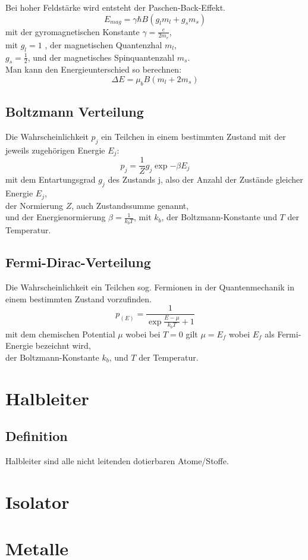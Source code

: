       Bei hoher Feldstärke wird entsteht der Paschen-Back-Effekt.
      \begin{equation}
        E_{mag}= \gamma  \hbar  B \left( g_l m_l + g_s m_s \right)
      \end{equation}
      mit der gyromagnetischen Konstante $\gamma = \frac{e}{2m_e}$, \\
      mit $g_l=1$ , der magnetischen Quantenzhal $m_l$, \\
      $g_s=\frac{1}{2}$, und der magnetisches Spinquantenzahl $m_s$.
      \\
      Man kann den Energieunterschied so berechnen:
      \begin{equation}
        \Delta E = \mu_b B \left( m_l + 2 m_s \right)
      \end{equation}

  \subsection{Boltzmann Verteilung}
    Die Wahrscheinlichkeit $p_j$ ein Teilchen in einem bestimmten Zustand mit der jeweils zugehörigen Energie $E_j$:
    \begin{equation}
      p_j= \frac{1}{Z} g_j \exp{-\beta E_j}
    \end{equation}
    mit dem Entartungsgrad $g_j$ des Zustands j, also der Anzahl der Zustände gleicher Energie $E_j$, \\
    der Normierung $Z$, auch Zustandssumme genannt, \\
    und der Energienormierung $\beta = \frac{1}{k_b T}$, mit $k_b$, der Boltzmann-Konstante und $T$ der Temperatur.
  \subsection{Fermi-Dirac-Verteilung}
    Die Wahrscheinlichkeit ein Teilchen sog. Fermionen in der Quantenmechanik in einem bestimmten Zustand vorzufinden. 
    \begin{equation}
      p_{(E)} = \frac{1}{\exp{\frac{E-\mu }{k_b T}} +1}
    \end{equation}
    mit dem chemischen Potential $\mu$ wobei bei $T=0$ gilt $\mu = E_f$ wobei $E_f$ als Fermi-Energie bezeichnt wird,\\
    der Boltzmann-Konstante $k_b$, und $T$ der Temperatur.


    \section{Halbleiter}
      \subsection{Definition}
        Halbleiter sind alle nicht leitenden dotierbaren Atome/Stoffe.


    \section{Isolator}


    \section{Metalle}
